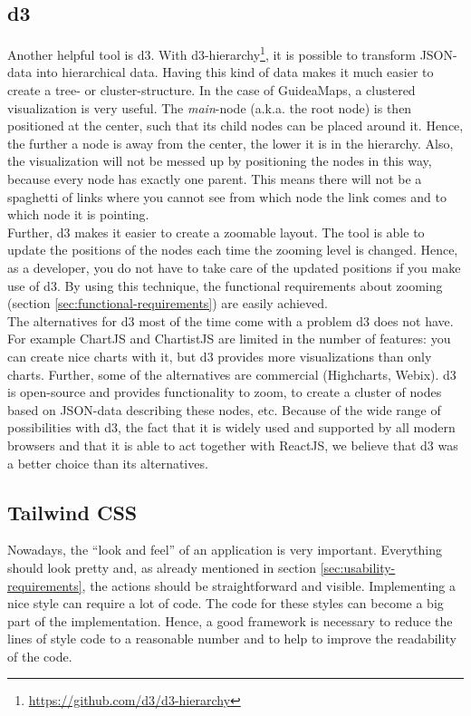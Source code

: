 \subsection{d3}\label{sec:d3}
Another helpful tool is d3. With d3-hierarchy\footnote{\url{https://github.com/d3/d3-hierarchy}}, it is possible to transform JSON-data into hierarchical data. Having this kind of data makes it much easier to create a tree- or cluster-structure. In the case of GuideaMaps, a clustered visualization is very useful. The \textit{main}-node (a.k.a. the root node) is then positioned at the center, such that its child nodes can be placed around it. Hence, the further a node is away from the center, the lower it is in the hierarchy. Also, the visualization will not be messed up by positioning the nodes in this way, because every node has exactly one parent. This means there will not be a spaghetti of links where you cannot see from which node the link comes and to which node it is pointing.\\

Further, d3 makes it easier to create a zoomable layout. The tool is able to update the positions of the nodes each time the zooming level is changed. Hence, as a developer, you do not have to take care of the updated positions if you make use of d3. By using this technique, the functional requirements about zooming (section \ref{sec:functional-requirements}) are easily achieved.\\

The alternatives for d3 most of the time come with a problem d3 does not have. For example ChartJS and ChartistJS are limited in the number of features: you can create nice charts with it, but d3 provides more visualizations than only charts. Further, some of the alternatives are commercial (Highcharts, Webix). d3 is open-source and provides functionality to zoom, to create a cluster of nodes based on JSON-data describing these nodes, etc. Because of the wide range of possibilities with d3, the fact that it is widely used and supported by all modern browsers and that it is able to act together with ReactJS, we believe that d3 was a better choice than its alternatives. 

\subsection{Tailwind CSS}\label{sec:tailwind}
Nowadays, the ``look and feel'' of an application is very important. Everything should look pretty and, as already mentioned in section \ref{sec:usability-requirements}, the actions should be straightforward and visible. Implementing a nice style can require a lot of code. The code for these styles can become a big part of the implementation. Hence, a good framework is necessary to reduce the lines of style code to a reasonable number and to help to improve the readability of the code.\\

